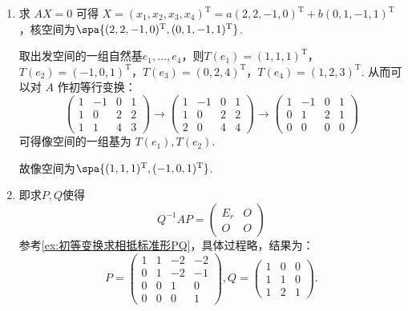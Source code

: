 \begin{enumerate}
\begin{enumerate}
        \item
            求 $AX=0$ 可得 $X=(x_1,x_2,x_3,x_4)^\mathrm{T} = a(2,2,-1,0)^\mathrm{T} + b(0,1,-1,1)^\mathrm{T}$，核空间为$\spa\{(2,2,-1,0)^\mathrm{T}, (0,1,-1,1)^\mathrm{T}\}$.

            取出发空间的一组自然基$e_1,\ldots,e_4$，则$T(e_1)=(1,1,1)^\mathrm{T}$，$T(e_2)=(-1,0,1)^\mathrm{T}$，$T(e_3)=(0,2,4)^\mathrm{T}$，$T(e_4)=(1,2,3)^\mathrm{T}$. 从而可以对 $A$ 作初等行变换：
            \[
            \begin{pmatrix}
                1 & -1 & 0 & 1 \\
                1 & 0 & 2 & 2 \\
                1 & 1 & 4 & 3
            \end{pmatrix}
            \to
            \begin{pmatrix}
                1 & -1 & 0 & 1 \\
                1 & 0 & 2 & 2 \\
                2 & 0 & 4 & 4
            \end{pmatrix}
            \to
            \begin{pmatrix}
                1 & -1 & 0 & 1 \\
                0 & 1 & 2 & 1 \\
                0 & 0 & 0 & 0
            \end{pmatrix}
            \]
            可得像空间的一组基为 $T(e_1), T(e_2)$.

            故像空间为$\spa\{(1,1,1)^\mathrm{T}, (-1,0,1)^\mathrm{T}\}$.
        \item 即求$P,Q$使得
            \[
            Q^{-1}AP =
            \begin{pmatrix}
                E_r & O \\
                O & O
            \end{pmatrix}
            \]
            参考\autoref{ex:初等变换求相抵标准形PQ}，具体过程略，结果为：
            \[
            P =
            \begin{pmatrix}
                1 & 1 & -2 & -2 \\
                0 & 1 & -2 & -1 \\
                0 & 0 & 1 & 0 \\
                0 & 0 & 0 & 1
            \end{pmatrix},
            Q =
            \begin{pmatrix}
                1 & 0 & 0 \\
                1 & 1 & 0 \\
                1 & 2 & 1
            \end{pmatrix}.
            \]
    \end{enumerate}


\end{enumerate}
